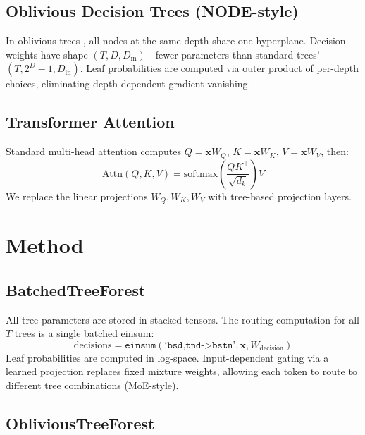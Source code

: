 \documentclass[11pt,a4paper]{article}
\begin{document}
\subsection{Oblivious Decision Trees (NODE-style)}

In oblivious trees \citep{popov2020neural}, all nodes at the same depth share one hyperplane. Decision weights have shape $(T, D, D_{\text{in}})$---fewer parameters than standard trees' $(T, 2^D-1, D_{\text{in}})$. Leaf probabilities are computed via outer product of per-depth choices, eliminating depth-dependent gradient vanishing.

\subsection{Transformer Attention}

Standard multi-head attention computes $Q = \mathbf{x} W_Q$, $K = \mathbf{x} W_K$, $V = \mathbf{x} W_V$, then:
\begin{equation}
    \text{Attn}(Q, K, V) = \text{softmax}\!\left(\frac{QK^\top}{\sqrt{d_k}}\right) V
\end{equation}
We replace the linear projections $W_Q, W_K, W_V$ with tree-based projection layers.

\section{Method}

\subsection{BatchedTreeForest}

All tree parameters are stored in stacked tensors. The routing computation for all $T$ trees is a single batched einsum:
\begin{equation}
    \text{decisions} = \texttt{einsum}(\texttt{`bsd,tnd->bstn'}, \mathbf{x}, W_{\text{decision}})
\end{equation}
Leaf probabilities are computed in log-space. Input-dependent gating via a learned projection replaces fixed mixture weights, allowing each token to route to different tree combinations (MoE-style).

\subsection{ObliviousTreeForest}
\end{document}
